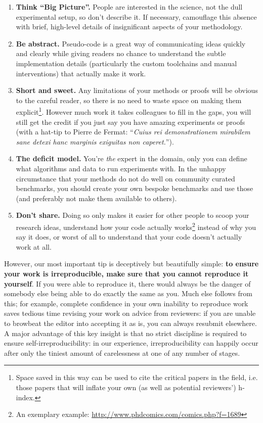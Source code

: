 \documentclass[a4paper,11pt]{article}
\begin{document}
\begin{enumerate}
\item {\textbf{Think ``Big Picture''.}} People are interested in the
science, not the dull experimental setup, so don't describe it. If
necessary, camouflage this absence with brief, high-level details of
insignificant aspects of your methodology.
\item {\textbf{Be abstract.}} Pseudo-code is a great way of
communicating ideas quickly and clearly while giving readers no chance
to understand the subtle implementation details (particularly the
custom toolchains and manual interventions) that actually make it work.
\item {\textbf{Short and sweet.}} Any limitations of your
methods or proofs will be obvious to the careful reader, so there is
no need to waste space on making them explicit\footnote{Space saved in
this way can be used to cite the critical papers in the field,
i.e. those papers that will inflate your own (as well as potential
reviewers') h-index.}. However much work it takes colleagues to fill
in the gaps, you will still get the credit if you just say you have
amazing experiments or proofs (with a hat-tip to Pierre de Fermat:
``{\emph{Cuius rei demonstrationem mirabilem sane detexi hanc marginis
exiguitas non caperet.}}'').
\item {\textbf{The deficit model.}} You're \emph{the} expert in the
domain, only you can define what algorithms and data to run
experiments with. In the unhappy circumstance that your methods do not
do well on community curated benchmarks, you should create your own
bespoke benchmarks and use those (and preferably not make them
available to others).
\item {\textbf{Don't share.}} Doing so only makes it easier for other
people to scoop your research ideas, understand how your code actually
works\footnote{An exemplary example:
\url{http://www.phdcomics.com/comics.php?f=1689}} instead of why you
say it does, or worst of all to understand that your code doesn't
actually work at all.
\end{enumerate}

However, our most important tip is deceptively but beautifully simple:
{\textbf{to ensure your work is irreproducible, make sure that you
cannot reproduce it yourself}}. If you were able to reproduce it,
there would always be the danger of somebody else being able to do
exactly the same as you. Much else follows from this; for example,
complete confidence in your own inability to reproduce work saves
tedious time revising your work on advice from reviewers: if you are
unable to browbeat the editor into accepting it as is, you can always
resubmit elsewhere. A major advantage of this key insight is that no
strict discipline is required to ensure self-irreproducibility: in our
experience, irreproducibility can happily occur after only the tiniest
amount of carelessness at one of any number of stages.
\end{document}
